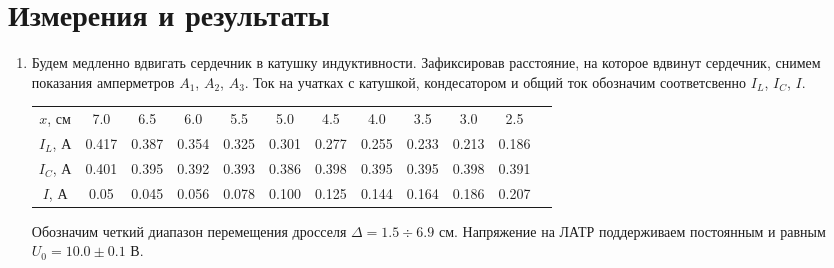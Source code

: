 \documentclass[a4paper, 12pt]{article}
\begin{document}
\section*{Измерения и результаты}
\begin{enumerate}
    \item Будем медленно вдвигать сердечник в катушку индуктивности. Зафиксировав расстояние, на которое вдвинут сердечник, снимем показания
    амперметров $A_{1}$, $A_{2}$, $A_{3}$. Ток на учатках с катушкой, кондесатором и общий ток обозначим соответсвенно $I_{L}$, $I_{C}$, $I$.
    \begin{table}[htbp]
        \centering
        \begin{tabular}{|c|c|c|c|c|c|c|c|c|c|c|c|}
            \hline
            $x$, см & 7.0 & 6.5 & 6.0 & 5.5 & 5.0 & 4.5 & 4.0 & 3.5 & 3.0 & 2.5 \\
            $I_{L}$, А & 0.417 & 0.387 & 0.354 & 0.325 & 0.301 & 0.277 & 0.255 & 0.233 & 0.213 & 0.186 \\
            $I_{C}$, А & 0.401 & 0.395 & 0.392 & 0.393 & 0.386 & 0.398 & 0.395 & 0.395 & 0.398 & 0.391 \\
            $I$, А & 0.05 & 0.045 & 0.056 & 0.078 & 0.100 & 0.125 & 0.144 & 0.164 & 0.186 & 0.207 \\
            \hline
        \end{tabular}
    \end{table}\newline
    Обозначим четкий диапазон перемещения дросселя $\Delta = 1.5 \div 6.9$ см.
    Напряжение на ЛАТР поддерживаем постоянным и равным $U_{0} = 10.0 \pm 0.1$ В.

\end{enumerate}
\end{document}
